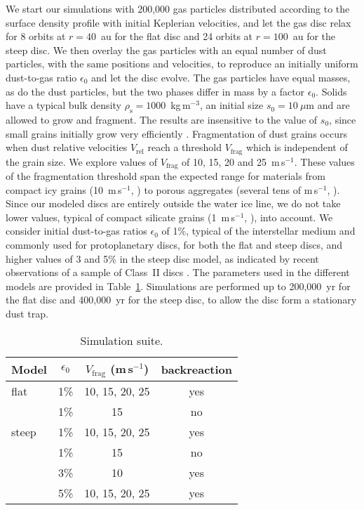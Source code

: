 \documentclass[a4paper,fleqn,usenatbib]{mnras}
\newcommand{\Vrel}{V_\mathrm{rel}}    %
\newcommand{\Vfrag}{V_\mathrm{frag}}  %
\begin{document}
We start our simulations with 200,000 gas particles distributed according to the surface density profile with initial Keplerian velocities, and let the gas disc relax for 8 orbits at $r=40$~au for the flat disc and 24 orbits at $r=100$~au for the steep disc. We then overlay the gas particles with an equal number of dust particles, with the same positions and velocities, to reproduce an initially uniform dust-to-gas ratio $\epsilon_0$ and let the disc evolve. The gas particles have equal masses, as do the dust particles, but the two phases differ in mass by a factor $\epsilon_0$. Solids have a typical bulk density $\rho_\mathrm{s}=1000$~kg\,m$^{-3}$, an initial size $s_0=10~\mu$m and are allowed to grow and fragment. The results are insensitive to the value of $s_0$, since small grains initially grow very efficiently \citep{Laibe2008}. Fragmentation of dust grains occurs when dust relative velocities $\Vrel$ reach a threshold $\Vfrag$ which is independent of the grain size. We explore values of $\Vfrag$ of 10, 15, 20 and 25~m\,s$^{-1}$. These values of the fragmentation threshold span the expected range for materials from compact icy grains (10~m\,s$^{-1}$, \citealt{Blum2008}) to porous aggregates (several tens of m\,s$^{-1}$, \citealt{Yamamoto2014}). Since our modeled discs are entirely outside the water ice line, we do not take lower values, typical of compact silicate grains (1~m\,s$^{-1}$, \citealt{Blum2008}), into account. We consider initial dust-to-gas ratios $\epsilon_0$ of 1\%, typical of the interstellar medium and commonly used for protoplanetary discs, for both the flat and steep discs, and higher values of 3 and 5\% in the steep disc model, as indicated by recent observations of a sample of Class~II discs \citep{Williams2014}. The parameters used in the different models are provided in Table~\ref{Tab:Sims}. Simulations are performed up to 200,000~yr for the flat disc and 400,000~yr for the steep disc, to allow the disc form a stationary dust trap.

\begin{table}
\caption{Simulation suite.}
\label{Tab:Sims}
\begin{center}
\begin{tabular}{lccc}
\hline
Model & $\epsilon_0$ & $\Vfrag$ (m\,s$^{-1}$) & backreaction \\
\hline
flat  & 1\% & 10, 15, 20, 25 & yes \\
      & 1\% & 15             & no  \\
\hline
steep & 1\% & 10, 15, 20, 25 & yes \\
      & 1\% & 15             & no  \\
      & 3\% & 10             & yes \\
      & 5\% & 10, 15, 20, 25 & yes \\
\hline
\end{tabular}
\end{center}
\end{table}
\end{document}
